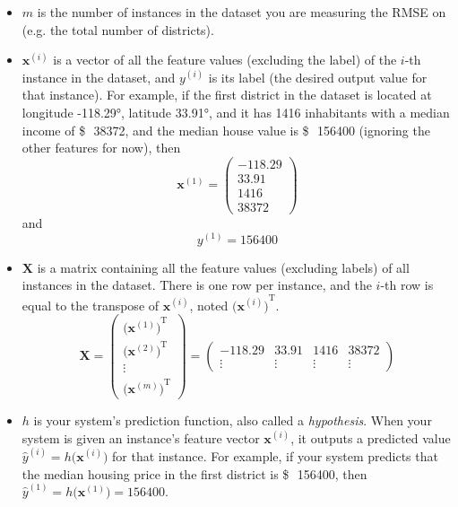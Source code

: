 \begin{itemize}
\item $m$ is the number of instances in the dataset you are measuring the RMSE on (e.g. the total number of districts).
\item $\mathbf{x}^{(i)}$ is a vector of all the feature values (excluding the label) of the $i$-th instance in the dataset, and $y^{(i)}$ is its label (the desired output value for that instance). For example, if the first district in the dataset is located at longitude \ang{-118.29}, latitude \ang{33.91}, and it has \num{1416} inhabitants with a median income of \SI{38372}[\$\,]{}, and the median house value is \SI{156400}[\$\,]{} (ignoring the other
features for now), then
\begin{equation}
\mathbf{x}^{(1)}=\begin{pmatrix}
-118.29\\
33.91\\
\num{1416}\\
\num{38372}
\end{pmatrix}
\end{equation}
and
\begin{equation}
y^{(1)}=\num{156400}
\end{equation}
\item $\mathbf{X}$ is a matrix containing all the feature values (excluding labels) of all instances in the dataset. There is one row per instance, and the $i$-th row is equal to the transpose of $\mathbf{x}^{(i)}$, noted ${\bigl(\mathbf{x}^{(i)}\bigr)}^{\mathrm{T}}$.
\begin{equation}
\mathbf{X}=\begin{pmatrix}
{\bigl(\mathbf{x}^{(1)}\bigr)}^{\mathrm{T}}\\
{\bigl(\mathbf{x}^{(2)}\bigr)}^{\mathrm{T}}\\
\vdots\\
{\bigl(\mathbf{x}^{(m)}\bigr)}^{\mathrm{T}}
\end{pmatrix}=\begin{pmatrix}
-118.29 & 33.91 & \num{1416} & \num{38372} \\
\vdots & \vdots & \vdots & \vdots
\end{pmatrix}
\end{equation}
\item $h$ is your system's prediction function, also called a \emph{hypothesis}. When your system is given an instance's feature vector $\mathbf{x}^{(i)}$, it outputs a predicted value $\widehat{y}^{(i)}=h\bigl(\mathbf{x}^{(i)}\bigr)$ for that instance. For example, if your system predicts that the median housing price in the first district is \SI{156400}[\$\,]{}, then $\widehat{y}^{(1)}=h\bigl(\mathbf{x}^{(1)}\bigr)=\num{156400}$.
\end{itemize}


